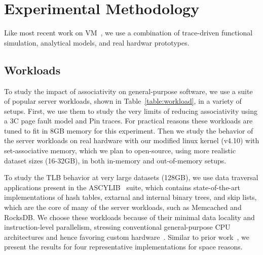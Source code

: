 \section{Experimental Methodology}
\label{sec:methodology}

Like most recent work on VM~\cite{basu:efficient, pham:increasing, pham:colt, bhattacharjee:large-reach, barr:spectlb, papadopoulou:prediction-based, saulsbury:recently-based}, we use a combination of trace-driven functional simulation, analytical models, and real hardwar prototypes.

\subsection{Workloads}

To study the impact of associativity on general-purpose software, we use a suite of popular server workloads, shown in Table~\ref{table:workload}, in a variety of setups. First, we use them to study the very limits of reducing associativity using a 3C page fault model and Pin traces. For practical reasons these workloads are tuned to fit in 8GB memory for this experiment. Then we study the behavior of the server workloads on real hardware with our modified linux kernel (v4.10) with set-associative memory, which we plan to open-source, using more realistic dataset sizes (16-32GB), in both in-memory and out-of-memory setups.

To study the TLB behavior at very large datasets (128GB), we use  data traversal applications present in the ASCYLIB~\cite{david:asynchronized} suite, which contains state-of-the-art implementations of hash tables, extarnal and internal binary trees, and skip lists, which are the core of many of the server workloads, such as Memcached and RocksDB. We choose these workloads because of their minimal data locality and instruction-level parallelism, stressing conventional general-purpose CPU architectures and hence favoring custom hardware~\cite{ haria:devirtualizing, picorel:near-memory, kocberber:meet, hsieh:accelerating}. Similar to prior work~\cite{picorel:near-memory}, we present the results for four representative implementations for space reasons. 


